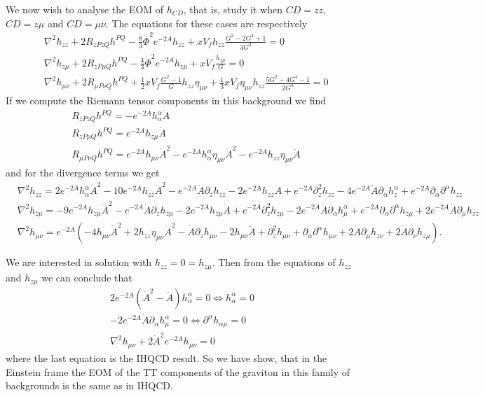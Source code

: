 \documentclass[10 pt]{article}
\begin{document}
We now wish to analyse the EOM of $h_{CD}$, that is, study it when $CD = zz$, $CD = z\mu$ and $CD = \mu \nu$. The equations for these cases are respectively
\begin{align}
&\nabla^2 h_{zz} + 2 R_{zPzQ} h^{PQ} - \frac{8}{3} {\dot{\Phi}}^2 e^{-2A} h_{zz} + x V_f h_{zz} \frac{G^2 - 2 G^4 +1}{3 G^3} = 0 \\
& \nabla^2 h_{z\mu} + 2 R_{zP\mu Q} h^{PQ} - \frac{4}{3} {\dot{\Phi}}^2 e^{-2A} h_{z \mu} + x V_f \frac{h_{z\mu}}{G} = 0 \\
& \nabla^2 h_{\mu \nu} + 2 R_{\mu P \nu Q} h^{PQ} + \frac{1}{2} x V_f \frac{G^2 - 1}{G} h_{zz} \eta_{\mu \nu} + \frac{1}{3} x V_f \eta_{\mu \nu} h_{zz} \frac{5 G^2 - 4 G^4 -1}{2 G^3} = 0
\end{align}
If we compute the Riemann tensor components in this background we find
\begin{align}
&R_{zPzQ} h^{PQ} = - e^{-2A} h_{\alpha}^\alpha \ddot{A} \\
&R_{zP\mu Q} h^{PQ} = e^{-2A} h_{z \mu} \ddot{A} \\
& R_{\mu P \nu Q} h^{PQ} = e^{-2A} h_{\mu \nu} {\dot{A}}^2 - e^{-2A} h_{\alpha}^\alpha \eta_{\mu \nu} {\dot{A}}^2 - e^{-2A} h_{zz} \eta_{\mu \nu} \ddot{A}
\end{align}
and for the divergence terms we get
\begin{align}
& \nabla^2 h_{zz} = 2 e^{-2A} h_{\alpha}^\alpha {\dot{A}}^2 - 10 e^{-2A} h_{zz}  {\dot{A}}^2  - e^{-2A} \dot{A} \partial_z h_{zz} - 2 e^{-2A} h_{zz} \ddot{A} + e^{-2A} \partial_z^2{h_{zz}} - 4 e^{-2A} \dot{A} \partial_\alpha h_{z}^\alpha + e^{-2A} \partial_\alpha \partial^\alpha h_{zz} \\
& \nabla^2 h_{z \mu} = - 9 e^{-2A} h_{z\mu} {\dot{A}}^2 - e^{-2A} \dot{A} \partial_z h_{z \mu} - 2 e^{-2A} h_{z \mu} \ddot{A} + e^{-2A} \partial_z^2 h_{z\mu} - 2 e^{-2A} \dot{A} \partial_\alpha h_{\mu}^\alpha + e^{-2A} \partial_\alpha \partial^\alpha h_{z\mu} + 2 e^{-2A} \dot{A} \partial_\mu h_{zz} \\
& \nabla^2 h_{\mu \nu} = e^{-2A} \left( -4 h_{\mu\nu} {\dot{A}}^2 + 2 h_{zz} \eta_{\mu\nu} {\dot{A}}^2 - \dot{A} \partial_z h_{\mu \nu} -2 h_{\mu \nu} \ddot{A} + \partial_z^2 h_{\mu \nu} + \partial_\alpha \partial^\alpha h_{\mu \nu} + 2 \dot{A} \partial_\mu h_{z \nu} + 2 \dot{A} \partial_\nu h_{z \mu}\right).
\end{align}

We are interested in solution with $h_{zz} = 0 = h_{z\mu}$. Then from the equations of $h_{zz}$ and $h_{z\mu}$ we can conclude that
\begin{align}
2 e^{-2A}  \left({\dot{A}}^2 - \ddot{A}\right) h_{\alpha}^\alpha = 0 \Leftrightarrow h_{\alpha}^\alpha = 0 \\
-2 e^{-2 A} \dot{A} \partial_\alpha h^{\alpha}_\mu = 0 \Leftrightarrow \partial^\alpha h_{\alpha \mu} = 0 \\
\nabla^2 h_{\mu \nu} + 2 {\dot{A}}^2 e^{-2A} h_{\mu \nu} = 0
\end{align}
where the last equation is the IHQCD result. So we have show, that in the Einstein frame the EOM of the TT components of the graviton in this family of backgrounds is the same as in IHQCD.
\end{document}
